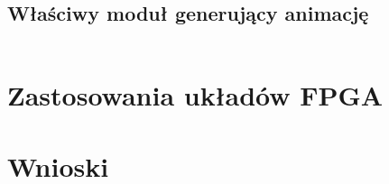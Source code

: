 \documentclass[a4paper]{article}
\begin{document}
\subsection{Właściwy moduł generujący animację}
\begin{verbatim}

\end{verbatim}

\section{Zastosowania układów FPGA}
\section{Wnioski}
\end{document}

